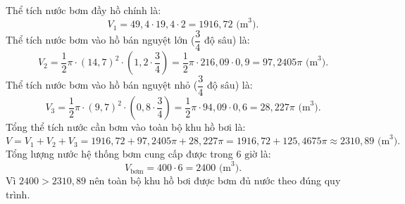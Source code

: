 \begin{bt}
{\begin{enumerate}[a)]
	Thể tích nước bơm đầy hồ chính là:
	$$V_1 = 49{,}4 \cdot 19{,}4 \cdot 2 = 1916{,}72\text{ (m}^3\text{)}.$$
	Thể tích nước bơm vào hồ bán nguyệt lớn ($\dfrac{3}{4}$ độ sâu) là:
	$$V_2 = \dfrac{1}{2}\pi \cdot (14{,}7)^2 \cdot \left(1{,}2 \cdot \dfrac{3}{4}\right) = \dfrac{1}{2}\pi \cdot 216{,}09 \cdot 0{,}9 = 97{,}2405\pi\text{ (m}^3\text{)}.$$
	Thể tích nước bơm vào hồ bán nguyệt nhỏ ($\dfrac{3}{4}$ độ sâu) là:
	$$V_3 = \dfrac{1}{2}\pi \cdot (9{,}7)^2 \cdot \left(0{,}8 \cdot \dfrac{3}{4}\right) = \dfrac{1}{2}\pi \cdot 94{,}09 \cdot 0{,}6 = 28{,}227\pi\text{ (m}^3\text{)}.$$
	Tổng thể tích nước cần bơm vào toàn bộ khu hồ bơi là:
	$$V = V_1 + V_2 + V_3 = 1916{,}72 + 97{,}2405\pi + 28{,}227\pi = 1916{,}72 + 125{,}4675\pi \approx 2310{,}89\text{ (m}^3\text{)}.$$
	Tổng lượng nước hệ thống bơm cung cấp được trong $6\text{ giờ}$ là:
	$$V_{\text{bơm}} = 400 \cdot 6 = 2400\text{ (m}^3\text{)}.$$
	Vì $2400 > 2310{,}89$ nên toàn bộ khu hồ bơi được bơm đủ nước theo đúng quy trình.
\end{enumerate}
}
\end{bt}

